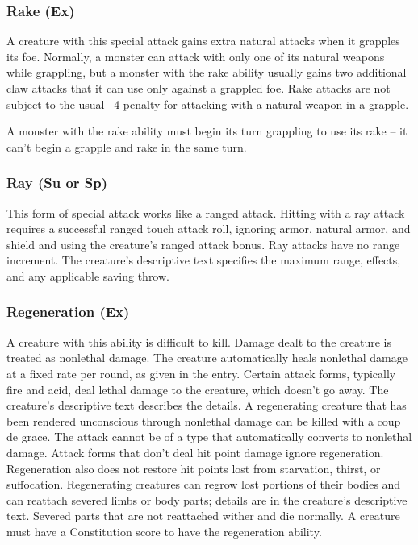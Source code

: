 {\subsubsection{Rake (Ex)} A creature with this special attack gains extra natural attacks when it grapples its foe. Normally, a monster can attack with only one of its natural weapons while grappling, but a monster with the rake ability usually gains two additional claw attacks that it can use only against a grappled foe. Rake attacks are not subject to the usual –4 penalty for attacking with a natural weapon in a grapple.

A monster with the rake ability must begin its turn grappling to use its rake -- it can't begin a grapple and rake in the same turn.

\subsubsection{Ray (Su or Sp)} This form of special attack works like a ranged attack. Hitting with a ray attack requires a successful ranged touch attack roll, ignoring armor, natural armor, and shield and using the creature's ranged attack bonus. Ray attacks have no range increment. The creature's descriptive text specifies the maximum range, effects, and any applicable saving throw.

\subsubsection{Regeneration (Ex)} A creature with this ability is difficult to kill. Damage dealt to the creature is treated as nonlethal damage. The creature automatically heals nonlethal damage at a fixed rate per round, as given in the entry. Certain attack forms, typically fire and acid, deal lethal damage to the creature, which doesn't go away. The creature's descriptive text describes the details. A regenerating creature that has been rendered unconscious through nonlethal damage can be killed with a coup de grace. The attack cannot be of a type that automatically converts to nonlethal damage.
Attack forms that don't deal hit point damage ignore regeneration. Regeneration also does not restore hit points lost from starvation, thirst, or suffocation. Regenerating creatures can regrow lost portions of their bodies and can reattach severed limbs or body parts; details are in the creature's descriptive text. Severed parts that are not reattached wither and die normally.
A creature must have a Constitution score to have the regeneration ability.

}
